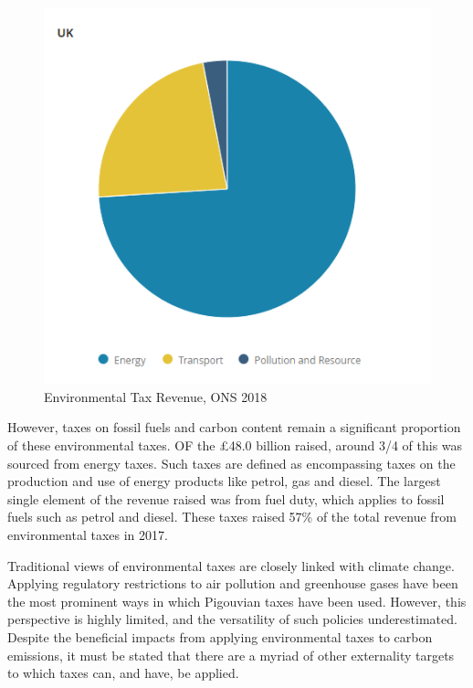 \documentclass[]{tufte-handout}
\begin{document}
\begin{figure}
\centering
\includegraphics{ChapterPictures/11-EnvironmentalTaxRevenue.PNG}
\caption{Environmental Tax Revenue, ONS 2018}
\end{figure}

However, taxes on fossil fuels and carbon content remain a significant
proportion of these environmental taxes. OF the £48.0 billion raised,
around 3/4 of this was sourced from energy taxes. Such taxes are defined
as encompassing taxes on the production and use of energy products like
petrol, gas and diesel. The largest single element of the revenue raised
was from fuel duty, which applies to fossil fuels such as petrol and
diesel. These taxes raised 57\% of the total revenue from environmental
taxes in 2017.

Traditional views of environmental taxes are closely linked with climate
change. Applying regulatory restrictions to air pollution and greenhouse
gases have been the most prominent ways in which Pigouvian taxes have
been used. However, this perspective is highly limited, and the
versatility of such policies underestimated. Despite the beneficial
impacts from applying environmental taxes to carbon emissions, it must
be stated that there are a myriad of other externality targets to which
taxes can, and have, be applied.
\end{document}
